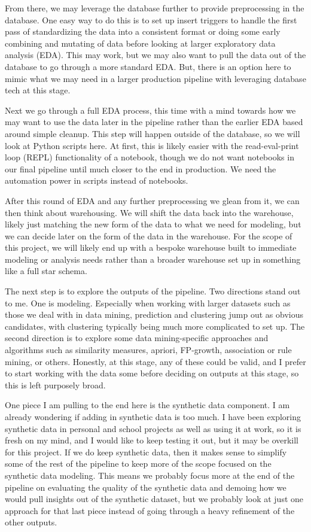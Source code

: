 \documentclass[sigconf, authorversion, nonacm]{acmart}
\begin{document}
    From there, we may leverage the database further to provide preprocessing in the database. One easy way to do this is to set up insert triggers to handle the first pass of standardizing the data into a consistent format or doing some early combining and mutating of data before looking at larger exploratory data analysis (EDA). This may work, but we may also want to pull the data out of the database to go through a more standard EDA. But, there is an option here to mimic what we may need in a larger production pipeline with leveraging database tech at this stage.

    Next we go through a full EDA process, this time with a mind towards how we may want to use the data later in the pipeline rather than the earlier EDA based around simple cleanup. This step will happen outside of the database, so we will look at Python scripts here. At first, this is likely easier with the read-eval-print loop (REPL) functionality of a notebook, though we do not want notebooks in our final pipeline until much closer to the end in production. We need the automation power in scripts instead of notebooks.

    After this round of EDA and any further preprocessing we glean from it, we can then think about warehousing. We will shift the data back into the warehouse, likely just matching the new form of the data to what we need for modeling, but we can decide later on the form of the data in the warehouse. For the scope of this project, we will likely end up with a bespoke warehouse built to immediate modeling or analysis needs rather than a broader warehouse set up in something like a full star schema.

    The next step is to explore the outputs of the pipeline. Two directions stand out to me. One is modeling. Especially when working with larger datasets such as those we deal with in data mining, prediction and clustering jump out as obvious candidates, with clustering typically being much more complicated to set up. The second direction is to explore some data mining-specific approaches and algorithms such as similarity measures, apriori, FP-growth, association or rule mining, or others. Honestly, at this stage, any of these could be valid, and I prefer to start working with the data some before deciding on outputs at this stage, so this is left purposely broad.

    One piece I am pulling to the end here is the synthetic data component. I am already wondering if adding in synthetic data is too much. I have been exploring synthetic data in personal and school projects as well as using it at work, so it is fresh on my mind, and I would like to keep testing it out, but it may be overkill for this project. If we do keep synthetic data, then it makes sense to simplify some of the rest of the pipeline to keep more of the scope focused on the synthetic data modeling. This means we probably focus more at the end of the pipeline on evaluating the quality of the synthetic data and demoing how we would pull insights out of the synthetic dataset, but we probably look at just one approach for that last piece instead of going through a heavy refinement of the other outputs.
\end{document}
